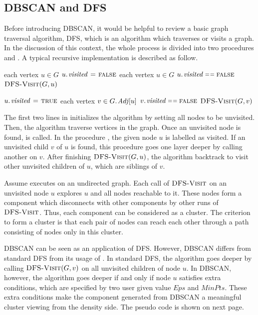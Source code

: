 \subsection{DBSCAN and DFS}
\label{subsec:DBSCANDFS}
Before introducing DBSCAN, it would be helpful to review a basic graph traversal algorithm, DFS, which is an algorithm which traverses or visits a graph. In the discussion of this context, the whole process is divided into two procedures  and . A typical recursive implementation is described as follow. 

\begin{codebox}
\li \For each vertex $u \in G$
\li		\Do
			$\attrib{u}{visited} \gets \const{false}$
	\End
\li	\For each vertex $u \in G$
\li		\Do
		\If \(\attrib{u}{visited} \isequal \const{false}\)
\li			\Then
				$\textnormal{\scshape DFS-Visit}(G, u)$
		\End
	\End
\end{codebox}

\begin{codebox}
\li	$\attrib{u}{visited} \gets \const{true}$
\li	\For each vertex $v \in \attrib{G}{Adj}[u]$
\li	\Do
		\If	$\attrib{v}{visited} \isequal \const{false} $
\li			\Then
				$\textnormal{\scshape DFS-Visit}(G, v)$
		\End
	\End
\end{codebox}

The first two lines in  initializes the algorithm by setting all nodes to be unvisited. Then, the algorithm traverse vertices in the graph. Once an unvisited node is found,  is called. In the procedure , the given node $u$ is labelled as visited. If an unvisited child $v$ of $u$ is found, this procedure goes one layer deeper by calling another  on $v$. After finishing $\textnormal{\scshape DFS-Visit}(G, u)$, the algorithm backtrack to visit other unvisited children of $u$, which are siblings of $v$.

Assume  executes on an undirected graph. Each call of $\textnormal{\scshape DFS-Visit}$ on an unvisited node $u$ explores $u$ and all nodes reachable to it. These nodes form a component which disconnects with other components by other runs of $\textnormal{\scshape DFS-Visit}$. Thus, each component can be considered as a cluster. The criterion to form a cluster is that each pair of nodes can reach each other through a path consisting of nodes only in this cluster.

DBSCAN can be seen as an application of DFS. However, DBSCAN differs from standard DFS from its usage of . In standard DFS, the algorithm goes deeper by calling $\textnormal{\scshape DFS-Visit}(G, v)$ on all unvisited children of node $u$. In DBSCAN, however, the algorithm goes deeper if and only if node $u$ satisfies extra conditions, which are specified by two user given value $Eps$ and $MinPts$. These extra conditions make the component generated from DBSCAN a meaningful cluster viewing from the density side. The pseudo code is shown on next page.

